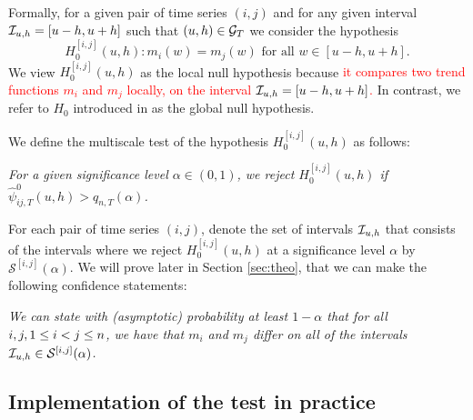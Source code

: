\documentclass[a4paper,12pt]{article}
\makeatletter
\renewcommand{\eqref}[1]{\tagform@{\ref{#1}}}
\makeatother
\begin{document}
Formally, for a given pair of time series $(i, j)$ and for any given interval \linebreak $\mathcal{I}_{u, h} = [u-h, u+h]$ such that $(u, h) \in \mathcal{G}_T$ we consider the hypothesis 
\[ H_0^{[i, j]}(u, h): m_i(w) = m_j(w) \text{ for all } w \in [u-h, u+h]. \] 
We view $H_0^{[i, j]}(u, h)$ as the local null hypothesis because \textcolor{red}{it compares two trend functions $m_i$ and $m_j$ locally, on the interval $\mathcal{I}_{u, h} = [u-h, u+h]$.} In contrast, we refer to $H_0$ introduced in \eqref{eq:null} as the global null hypothesis.

We define the multiscale test of the hypothesis $H_0^{[i, j]}(u, h)$ as follows: 
\begin{center}
\begin{minipage}[c][1.25cm][c]{13cm}
\textit{For a given significance level $\alpha \in (0,1)$, we reject $H_0^{[i, j]}(u, h)$ if \linebreak $\hat{\psi}^0_{ij, T}(u, h) > q_{n,T}(\alpha)$.}
\end{minipage}
\end{center}

For each pair of time series $(i, j)$, denote the set of intervals $\mathcal{I}_{u, h}$ that consists of the intervals where we reject $H_0^{[i, j]}(u, h)$ at a significance level $\alpha$ by $\mathcal{S}^{[i, j]}(\alpha)$. We will prove later in Section \ref{sec:theo}, that we can make the following confidence statements:

\begin{center}
\begin{minipage}[c][1.45cm][c]{13cm}
\textit{We can state with (asymptotic) probability at least $1-\alpha$ that for all $i, j, \linebreak1\leq i < j \leq n$, we have that $m_i$ and $m_j$ differ on all of the intervals $\mathcal{I}_{u, h} \in \mathcal{S}^{[i, j]}(\alpha)$.}
\end{minipage}
\end{center}


\subsection{Implementation of the test in practice}\label{subsec:test:impl}
\end{document}
